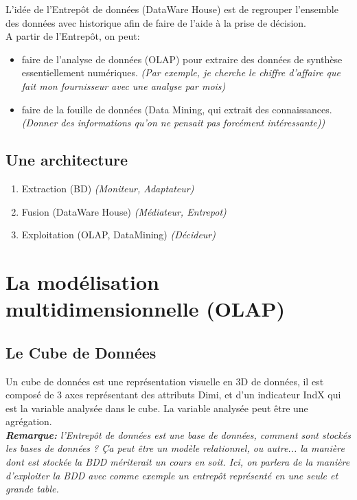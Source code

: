 \documentclass[a4paper,11pt]{article}
\begin{document}
		L'idée de l’Entrepôt de données (DataWare House) est de regrouper l'ensemble des données avec historique afin de faire de l'aide à la prise de décision.\\
		
		A partir de l’Entrepôt, on peut:
		\begin{itemize}
			\item faire de l'analyse de données (OLAP) pour extraire des données de synthèse essentiellement numériques. \emph{(Par exemple, je cherche le chiffre d'affaire que fait mon fournisseur avec une analyse par mois)}
			\item faire de la fouille de données (Data Mining, qui extrait des connaissances. \emph{(Donner des informations qu'on ne pensait pas forcément intéressante))}
		\end{itemize}
		
		\subsection{Une architecture}
		\begin{enumerate}
			\item Extraction (BD) \emph{(Moniteur, Adaptateur)}
			\item Fusion (DataWare House) \emph{(Médiateur, Entrepot)}
			\item Exploitation (OLAP, DataMining) \emph{(Décideur)}
		\end{enumerate}
			
	\section{La modélisation multidimensionnelle (OLAP)}
		\subsection{Le Cube de Données}
		Un cube de données est une représentation visuelle en 3D de données, il est composé de 3 axes représentant des attributs Dimi, et d'un indicateur IndX qui est la variable analysée dans le cube. La variable analysée peut être une agrégation.\\
		
		\emph{\textbf{Remarque:} l’Entrepôt de données est une base de données, comment sont stockés les bases de données ? Ça peut être un modèle relationnel, ou autre... la manière dont est stockée la BDD mériterait un cours en soit. Ici, on parlera de la manière d'exploiter la BDD avec comme exemple un entrepôt représenté en une seule et grande table.}\\
		
\end{document}
